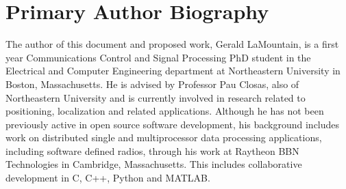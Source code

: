 \section{Primary Author Biography}

The author of this document and proposed work, Gerald LaMountain, is a first year Communications Control and Signal Processing PhD student in the Electrical and Computer Engineering department at Northeastern University in Boston, Massachusetts. He is advised by Professor Pau Closas, also of Northeastern University and is currently involved in research related to positioning, localization and related applications. Although he has not been previously active in open source software development, his background includes work on distributed single and multiprocessor data processing applications, including software defined radios, through his work at Raytheon BBN Technologies in Cambridge, Massachusetts. This includes collaborative development in C, C++, Python and MATLAB.